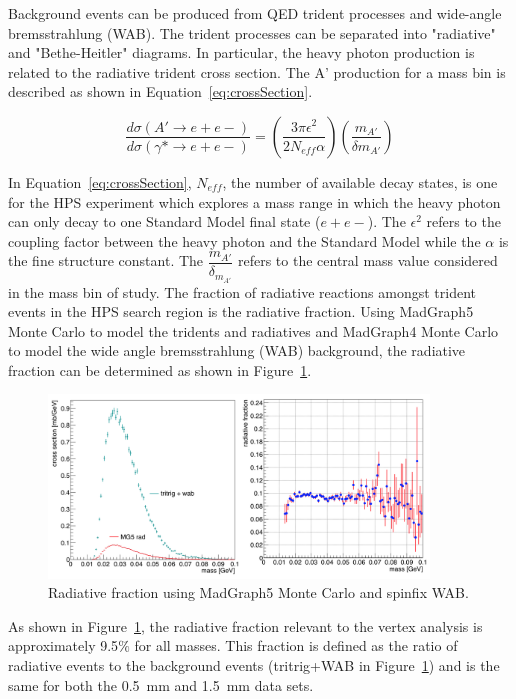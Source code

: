 \documentclass[twoside]{article}
\begin{document}
Background events can be produced from QED trident processes and wide-angle bremsstrahlung (WAB). The trident processes can be separated into "radiative" and "Bethe-Heitler" diagrams. In particular, the heavy photon production is related to the radiative trident cross section. The A' production for a mass bin is described as shown in Equation~\eqref{eq:crossSection}.

\begin{equation}
\label{eq:crossSection}
\dfrac{d\sigma(A'\rightarrow e+e-)}{d\sigma(\gamma*\rightarrow e+e-)} = \left(\dfrac{3\pi\epsilon^{2}}{2N_{eff}\alpha}\right)\left(\dfrac{m_{A'}}{\delta m_{A'}}\right)
\end{equation}

In Equation~\eqref{eq:crossSection}, $N_{eff}$, the number of available decay states, is one for the HPS experiment which explores a mass range in which the heavy photon can only decay to one Standard Model final state ($e+e-$). The $\epsilon^{2}$ refers to the coupling factor between the heavy photon and the Standard Model while the $\alpha$ is the fine structure constant. The $\dfrac{m_{A'}}{\delta_{m_{A'}}}$ refers to the central mass value considered in the mass bin of study. The fraction of radiative reactions amongst trident events in the HPS search region is the radiative fraction. Using MadGraph5 Monte Carlo to model the tridents and radiatives and MadGraph4 Monte Carlo to model the wide angle bremsstrahlung (WAB) background, the radiative fraction can be determined as shown in Figure~\ref{fig:radFrac}.

\begin{figure}[H]
  \centering
      \includegraphics[width=0.9\textwidth]{plots/radFrac.png}
  \caption{Radiative fraction using MadGraph5 Monte Carlo and spinfix WAB.}
  \label{fig:radFrac}
\end{figure} 

As shown in Figure~\ref{fig:radFrac}, the radiative fraction relevant to the vertex analysis is approximately 9.5$\%$ for all masses. This fraction is defined as the ratio of radiative events to the background events (tritrig+WAB in Figure~\ref{fig:radFrac}) and is the same for both the 0.5~mm and 1.5~mm data sets.
\end{document}
